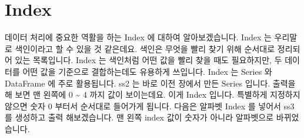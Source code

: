 \documentclass[letterpaper,10pt,english]{jupyterBook}
\begin{document}
\section{Index}
\label{\detokenize{chapter2/2.1.2_Python_Basics:index}}\label{\detokenize{chapter2/2.1.2_Python_Basics::doc}}
\sphinxAtStartPar
데이터 처리에 중요한 역활을 하는 Index 에 대하여 알아보겠습니다. Index 는 우리말로 색인이라고 할 수 있을 것 같은데요. 색인은 무엇을 빨리 찾기 위해 순서대로 정리되어 있는 목록입니다. Index 는 색인처럼 어떤 값을 빨리 찾을 때도 필요하지만, 두 데이터를 어떤 값을 기준으로 결합하는데도 유용하게 쓰입니다. Index 는 Series 와 DataFrame 에 주로 활용됩니다. ss2 는 바로 이전 장에서 만든 Series 입니다. 출력을 해 보면 맨 왼쪽에 0 \textasciitilde{} 4 까지 값이 보이는데요. 이게 Index 입니다. 특별하게 지정하지 않으면 숫자 0 부터서 순서대로 들어가게 됩니다. 다음은 알파벳 Index 를 넣어서 ss3 를 생성하고 출력 해보겠습니다. 맨 왼쪽 index 값이 숫자가 아니라 알파벳으로 바뀌었습니다.
\end{document}
